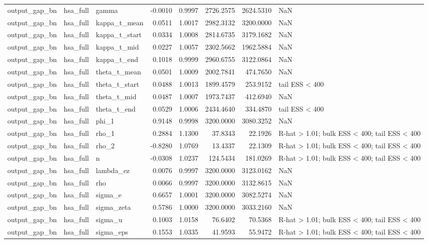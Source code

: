 \begin{tabular}{lllrrrrl}
output\_gap\_bn & hsa\_full & gamma & -0.0010 & 0.9997 & 2726.2575 & 2624.5310 & NaN \\
output\_gap\_bn & hsa\_full & kappa\_t\_mean & 0.0511 & 1.0017 & 2982.3132 & 3200.0000 & NaN \\
output\_gap\_bn & hsa\_full & kappa\_t\_start & 0.0334 & 1.0008 & 2814.6735 & 3179.1682 & NaN \\
output\_gap\_bn & hsa\_full & kappa\_t\_mid & 0.0227 & 1.0057 & 2302.5662 & 1962.5884 & NaN \\
output\_gap\_bn & hsa\_full & kappa\_t\_end & 0.1018 & 0.9999 & 2960.6755 & 3122.0864 & NaN \\
output\_gap\_bn & hsa\_full & theta\_t\_mean & 0.0501 & 1.0009 & 2002.7841 & 474.7650 & NaN \\
output\_gap\_bn & hsa\_full & theta\_t\_start & 0.0488 & 1.0013 & 1899.4579 & 253.9152 & tail ESS < 400 \\
output\_gap\_bn & hsa\_full & theta\_t\_mid & 0.0487 & 1.0007 & 1973.7437 & 412.6940 & NaN \\
output\_gap\_bn & hsa\_full & theta\_t\_end & 0.0529 & 1.0006 & 2434.4640 & 334.4870 & tail ESS < 400 \\
output\_gap\_bn & hsa\_full & phi\_1 & 0.9148 & 0.9998 & 3200.0000 & 3080.3252 & NaN \\
output\_gap\_bn & hsa\_full & rho\_1 & 0.2884 & 1.1300 & 37.8343 & 22.1926 & R-hat > 1.01; bulk ESS < 400; tail ESS < 400 \\
output\_gap\_bn & hsa\_full & rho\_2 & -0.8280 & 1.0769 & 13.4337 & 22.1309 & R-hat > 1.01; bulk ESS < 400; tail ESS < 400 \\
output\_gap\_bn & hsa\_full & n & -0.0308 & 1.0237 & 124.5434 & 181.0269 & R-hat > 1.01; bulk ESS < 400; tail ESS < 400 \\
output\_gap\_bn & hsa\_full & lambda\_ez & 0.0076 & 0.9997 & 3200.0000 & 3123.0162 & NaN \\
output\_gap\_bn & hsa\_full & rho & 0.0066 & 0.9997 & 3200.0000 & 3132.8615 & NaN \\
output\_gap\_bn & hsa\_full & sigma\_e & 0.6657 & 1.0001 & 3200.0000 & 3082.5274 & NaN \\
output\_gap\_bn & hsa\_full & sigma\_zeta & 0.5786 & 1.0000 & 3200.0000 & 3033.2160 & NaN \\
output\_gap\_bn & hsa\_full & sigma\_u & 0.1003 & 1.0158 & 76.6402 & 70.5368 & R-hat > 1.01; bulk ESS < 400; tail ESS < 400 \\
output\_gap\_bn & hsa\_full & sigma\_eps & 0.1553 & 1.0335 & 41.9593 & 55.9472 & R-hat > 1.01; bulk ESS < 400; tail ESS < 400 \\

\end{tabular}
